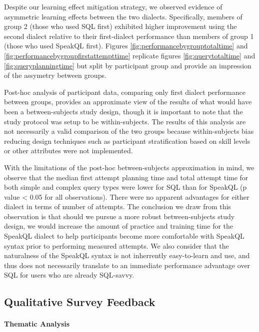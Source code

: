 Despite our learning effect mitigation strategy, we observed evidence of asymmetric learning effects between the two dialects. 
Specifically, members of group 2 (those who used SQL first) exhibited higher improvement using the second dialect relative to their first-dialect performance than members of group 1 (those who used SpeakQL first). 
Figures \ref{fig:performancebygrouptotaltime} and \ref{fig:performancebygroupfirstattempttime} replicate figures \ref{fig:querytotaltime} and \ref{fig:queryplanningtime} but split by participant group and provide an impression of the assymetry between groups. 

Post-hoc analysis of participant data, comparing only first dialect performance between groups, provides an approximate view of the results of what would have been a between-subjects study design, though it is important to note that the study protocol was setup to be within-subjects.
The results of this analysis are not necessarily a valid comparison of the two groups because within-subjects bias reducing design techniques such as participant stratification based on skill levels or other attributes were not implemented. 

With the limitations of the post-hoc between-subjects approximation in mind, we observe that the median first attempt planning time and total attempt time for both simple and complex query types were lower for SQL than for SpeakQL (p value < 0.05 for all observations). 
There were no apparent advantages for either dialect in terms of number of attempts. 
The conclusion we draw from this observation is that should we pursue a more robust between-subjects study design, we would increase the amount of practice and training time for the SpeakQL dialect to help participants become more comfortable with SpeakQL syntax prior to performing measured attempts.
We also consider that the naturalness of the SpeakQL syntax is not inherrently easy-to-learn and use, and thus does not necessarily translate to an immediate performance advantage over SQL for users who are already SQL-savvy. 




\subsection{Qualitative Survey Feedback}

\paragraph{\textbf{Thematic Analysis}} 

